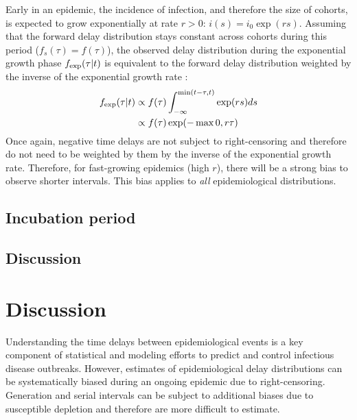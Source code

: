 \documentclass[12pt]{article}
\begin{document}
Early in an epidemic, the incidence of infection, and therefore the size of cohorts, is expected to grow exponentially at rate $r > 0$: $i(s) = i_0 \exp(rs)$.
Assuming that the forward delay distribution stays constant across cohorts during this period ($f_s(\tau) = f(\tau)$), 
the observed delay distribution during the exponential growth phase $f_{\tiny\textrm{exp}}(\tau|t)$ is equivalent to the forward delay distribution weighted by the inverse of the exponential growth rate \citep{britton2019estimation}:
\begin{equation}
\begin{aligned}
f_{\tiny\textrm{exp}}(\tau|t) &\propto f(\tau) \int_{-\infty}^{\min(t-\tau,t)} \exp(rs) ds\\
&\propto f(\tau) \exp(-\max{0, r\tau}) \\
\end{aligned}
\label{eq:exp}
\end{equation}
Once again, negative time delays are not subject to right-censoring and therefore do not need to be weighted by them by the inverse of the exponential growth rate.
Therefore, for fast-growing epidemics (high $r$), there will be a strong bias to observe shorter intervals.
This bias applies to \emph{all} epidemiological distributions.

\subsection{Incubation period}

\subsection{Discussion}

\section{Discussion}

Understanding the time delays between epidemiological events is a key component of statistical and modeling efforts to predict and control infectious disease outbreaks.
However, estimates of epidemiological delay distributions can be systematically biased during an ongoing epidemic due to right-censoring.
Generation and serial intervals can be subject to additional biases due to susceptible depletion and therefore are more difficult to estimate.
\end{document}
